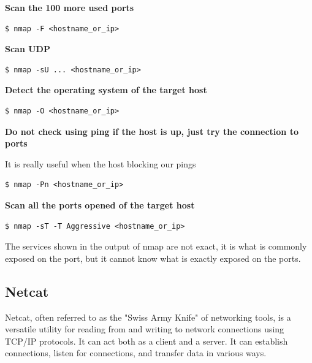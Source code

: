 \documentclass{article}
\newenvironment{blocktemplateII}[1]{%
    \tcolorbox[beamer,%
    noparskip,breakable,
    colframe=Green,%
    colbacklower=LimeGreen!75!LightGreen,%
    title=#1]}%
    {\endtcolorbox}
\newenvironment{codetemplate}[1][]{%
  \mybasecolorbox[#1]
  \itshape
}{%
  \endmybasecolorbox
}
\begin{document}
\textbf{Scan the 100 more used ports}
\begin{codetemplate}{}
\begin{verbatim}
$ nmap -F <hostname_or_ip>
\end{verbatim}
\end{codetemplate}

\textbf{Scan UDP}
\begin{codetemplate}{}
\begin{verbatim}
$ nmap -sU ... <hostname_or_ip>
\end{verbatim}
\end{codetemplate}

\textbf{Detect the operating system of the target host}
\begin{codetemplate}{}
\begin{verbatim}
$ nmap -O <hostname_or_ip>
\end{verbatim}
\end{codetemplate}

\textbf{Do not check using ping if the host is up, just try the connection to ports}

It is really useful when the host blocking our pings
\begin{codetemplate}{}
\begin{verbatim}
$ nmap -Pn <hostname_or_ip>
\end{verbatim}
\end{codetemplate}

\textbf{Scan all the ports opened of the target host}
\begin{codetemplate}{}
\begin{verbatim}
$ nmap -sT -T Aggressive <hostname_or_ip>
\end{verbatim}
\end{codetemplate}

\begin{blocktemplateII}{NOTE}
The services shown in the output of nmap are not exact, it is what is commonly exposed on the port, but it cannot know what is exactly exposed on the ports.
\end{blocktemplateII}

\subsection{Netcat}

Netcat, often referred to as the "Swiss Army Knife" of networking tools, is a versatile utility for reading from and writing to network connections using TCP/IP protocols. It can act both as a client and a server. It can establish connections, listen for connections, and transfer data in various ways.
\end{document}
